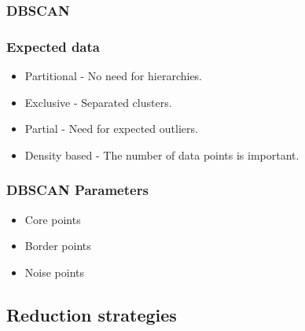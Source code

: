 \subsubsection{DBSCAN} %
\begin{frame}
\frametitle{Expected data}
	\begin{itemize}
		\item Partitional - No need for hierarchies.
		\item Exclusive - Separated clusters.
		\item Partial - Need for expected outliers.
		\item Density based - The number of data points is important.
	\end{itemize}
\end{frame}	
\begin{frame}
\frametitle{DBSCAN Parameters}
	\begin{itemize}
		\item Core points
		\item Border points
		\item Noise points
	\end{itemize}
\end{frame}	


\subsection{Reduction strategies}
